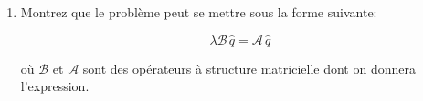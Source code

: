 \documentclass[a4paper,11pt]{article}
\begin{document}
\begin{enumerate}
%


%
%


\item Montrez que le problème peut se mettre sous la forme suivante:

\begin{equation}
\lambda  {\mathcal B} \, \hat{q} = {\mathcal A} \, \hat{q}
\end{equation}

où $ {\mathcal B}$ et  ${\mathcal A}$ sont des opérateurs à structure matricielle dont on donnera l'expression.
\end{enumerate}
\end{document}
